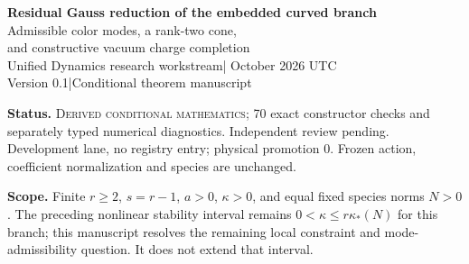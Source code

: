 \documentclass[11pt,a4paper]{article}
\begin{document}
\begin{center}
{\Large\bfseries Residual Gauss reduction of the embedded curved branch}\\[8pt]
{\large Admissible color modes, a rank-two cone,\\and constructive vacuum charge completion}\\[10pt]
Unified Dynamics research workstream\quad | October 2026 UTC\\
Version 0.1\quad |\quad Conditional theorem manuscript
\end{center}
\begin{abstract}
The additional-color modes of the finite unitary link--matter model form a symplectic slice, rather than a final reduced phase space. We compute its remaining global $\mathrm U(r-1)$ moment map directly from the original matrix Gauss law. In oscillator variables it is a difference of color Gram matrices plus vacuum self-commutators. Its trace excludes any nonzero single-orientation circular color preparation. At rank two the exact local constraint quotient is homeomorphic in its color factor to the cone of complex $28\times28$ matrices of rank at most one. Its open stratum has 110 real color dimensions; the full principal stratum has 222 real dimensions. At every higher finite rank we construct a zero-moment point with trivial stabilizer and obtain the principal dimension. Any trace-balanced color preparation can be completed by a single vacuum oscillator, with explicit energy bounds, using a weighted-shift self-commutator. The local constraint model is exact by the standard symplectic slice theorem; the displayed mode evolution is only its quadratic Hamiltonian. No physical gauge identification or experimental result is asserted.
\end{abstract}
\textbf{Status.} \textsc{Derived conditional mathematics}; 70 exact constructor checks and separately typed numerical diagnostics. Independent review pending. Development lane, no registry entry; physical promotion $0$. Frozen action, coefficient normalization and species are unchanged.

\textbf{Scope.} Finite $r\ge2$, $s=r-1$, $a>0$, $\kappa>0$, and equal fixed species norms $N>0$. The preceding nonlinear stability interval remains $0<\kappa\le r\kappa_*(N)$ for this branch; this manuscript resolves the remaining local constraint and mode-admissibility question. It does not extend that interval.

\newpage
\end{document}
